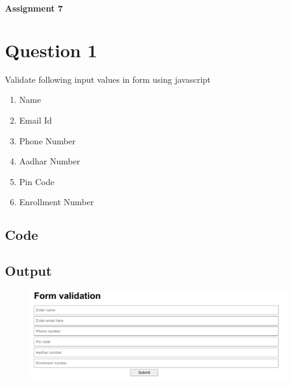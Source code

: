 \documentclass{article}
\begin{document}
{\centerline{\bfseries \Huge Assignment 7}}

\section*{Question 1}
Validate following input values in form using javascript
\begin{enumerate}
    \item Name
    \item Email Id
    \item Phone Number
    \item Aadhar Number
    \item Pin Code
    \item Enrollment Number
\end{enumerate}

\subsection*{Code}

\newpage
\subsection*{Output}
\begin{figure}[H]
    \centering
    \includegraphics[width=18cm]{1/out.png}
\end{figure}
\end{document}
